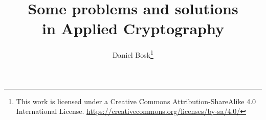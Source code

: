 \title{Some problems and solutions\\
       in Applied Cryptography}
\author{Daniel Bosk\thanks{%
    This work is licensed under a Creative Commons Attribution-ShareAlike 4.0
    International License.
    \url{https://creativecommons.org/licenses/by-sa/4.0/}%
}}

\mode*

\begin{frame}
  \maketitle
\end{frame}

\begin{abstract}
  
\end{abstract}

\clearpage

\begin{frame}
\end{frame}

\clearpage








\begin{frame}[allowframebreaks]
  \printbibliography
\end{frame}
